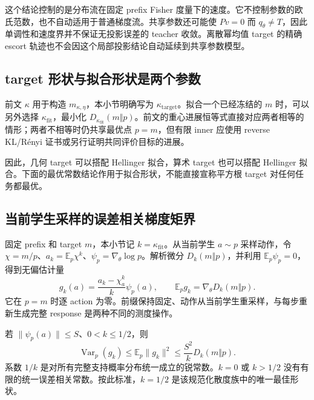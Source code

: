 \documentclass[lang=cn,scheme=chinese,openany]{../book/elegantbook}
\newcommand{\E}{\mathbb E}
\newcommand{\Var}{\operatorname{Var}}
\begin{document}
这个结论控制的是分布流在固定 prefix Fisher 度量下的速度。它不控制参数的欧氏范数，也不自动适用于普通梯度流。共享参数还可能使 $Pv=0$ 而 $q_\theta\ne T$，因此单调性和速度界并不保证无投影误差的 teacher 收敛。离散幂均值 target 的精确 escort 轨迹也不会因这个局部投影结论自动延续到共享参数模型。



\subsection{target 形状与拟合形状是两个参数}

前文 $\kappa$ 用于构造 $m_{\kappa,\eta}$，本小节明确写为 $\kappa_{\mathrm{target}}$。拟合一个已经冻结的 $m$ 时，可以另外选择 $\kappa_{\mathrm{fit}}$，最小化 $D_{\kappa_{\mathrm{fit}}}(m\Vert p)$。前文的重心进展恒等式直接对应两者相等的情形；两者不相等时仍共享最优点 $p=m$，但有限 inner 应使用 reverse KL/Rényi 证书或另行证明共同评价目标的进展。

因此，几何 target 可以搭配 Hellinger 拟合，算术 target 也可以搭配 Hellinger 拟合。下面的最优常数结论作用于拟合形状，不能直接宣称平方根 target 对任何任务都最优。

\subsection{当前学生采样的误差相关梯度矩界}

固定 prefix 和 target $m$，本小节记 $k=\kappa_{\mathrm{fit}}$。从当前学生 $a\sim p$ 采样动作，令 $\chi=m/p$、$a_k=\E_p\chi^k$、$\psi_p=\nabla_\theta\log p$。解析微分 $D_k(m\Vert p)$，并利用 $\E_p\psi_p=0$，得到无偏估计量
\begin{equation}
 g_k(a)=\frac{a_k-\chi_a^k}{k}\psi_p(a),\qquad
 \E_pg_k=\nabla_\theta D_k(m\Vert p).
\end{equation}
它在 $p=m$ 时逐 action 为零。前缀保持固定、动作从当前学生重采样，与每步重新生成完整 response 是两种不同的测度操作。

\begin{theorem}[误差相关二阶矩的锐常数]
\label{thm:proximal-sharp-self-bound}
若 $\|\psi_p(a)\|\le S$、$0<k\le1/2$，则
\begin{equation}
 \Var_p(g_k)\le\E_p\|g_k\|^2
 \le\frac{S^2}{k}D_k(m\Vert p).
\end{equation}
系数 $1/k$ 是对所有完整支持概率分布统一成立的锐常数。$k=0$ 或 $k>1/2$ 没有有限的统一误差相关常数。按此标准，$k=1/2$ 是该规范化散度族中的唯一最佳形状。
\end{theorem}
\end{document}
